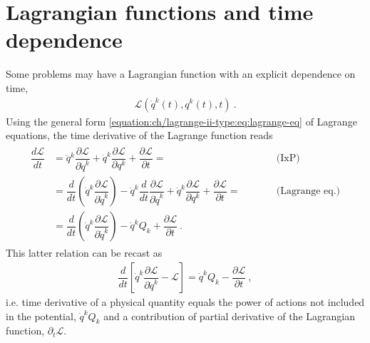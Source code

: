 \documentclass[letterpaper,10pt,english]{jupyterBook}
\begin{document}
\section{Lagrangian functions and time dependence}
\label{\detokenize{ch/lagrange-t:lagrangian-functions-and-time-dependence}}\label{\detokenize{ch/lagrange-t:classical-mechanics-lagrange-time}}\label{\detokenize{ch/lagrange-t::doc}}
\sphinxAtStartPar
Some problems may have a Lagrangian function with an explicit dependence on time,
\begin{equation*}
\begin{split}\mathscr{L}(\dot{q}^k(t),q^k(t),t) \ .\end{split}
\end{equation*}
\sphinxAtStartPar
Using the general form \eqref{equation:ch/lagrange-ii-type:eq:lagrange-eq} of Lagrange equations, the time derivative of the Lagrange function reads
\begin{equation*}
\begin{split}\begin{aligned}
\dfrac{d \mathscr{L}}{dt}
 & =
  \ddot{q}^k \dfrac{\partial \mathscr{L}}{\partial \dot{q}^k}
 + \dot{q}^k \dfrac{\partial \mathscr{L}}{\partial       q^k}
 + \dfrac{\partial \mathscr{L}}{\partial  t} = && \qquad \text{(IxP)} \\
 & = \dfrac{d}{dt} \left( \dot{q}^k \dfrac{\partial \mathscr{L}}{\partial \dot{q}^k} \right) - \dot{q}^k \dfrac{d}{dt} \dfrac{\partial \mathscr{L}}{\partial \dot{q}^k}
 + \dot{q}^k \dfrac{\partial \mathscr{L}}{\partial       q^k}
 + \dfrac{\partial \mathscr{L}}{\partial  t} = && \qquad \text{(Lagrange eq.)} \\
 & = \dfrac{d}{dt} \left( \dot{q}^k \dfrac{\partial \mathscr{L}}{\partial \dot{q}^k} \right) - \dot{q}^k Q_k
 + \dfrac{\partial \mathscr{L}}{\partial  t} \ .
\end{aligned}\end{split}
\end{equation*}
\sphinxAtStartPar
This latter relation can be recast as
\begin{equation}\label{equation:ch/lagrange-t:eq:euler-beltrami}
\begin{split}\dfrac{d}{dt} \left[ \dot{q}^k \dfrac{\partial \mathscr{L}}{\partial \dot{q}^k} - \mathscr{L} \right] = \dot{q}^k Q_k - \dfrac{\partial \mathscr{L}}{\partial t} \ ,\end{split}
\end{equation}
\sphinxAtStartPar
i.e. time derivative of a physical quantity equals the power of actions not included in the potential, \(\dot{q}^k Q_k\) and a contribution of partial derivative of the Lagrangian function, \(\partial_t \mathscr{L}\).
\end{document}
